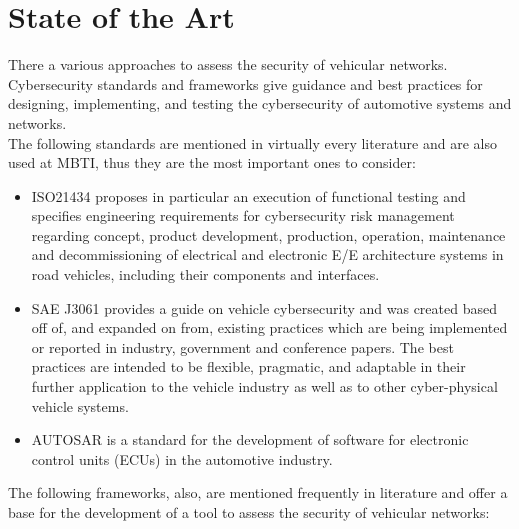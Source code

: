 \chapter{State of the Art}
\label{chp:stateoftheart}

There a various approaches to assess the security of vehicular networks.
Cybersecurity standards and frameworks give guidance and best practices for designing, implementing, 
and testing the cybersecurity of automotive systems and networks.\\

The following standards are mentioned in virtually every literature and are also used at MBTI,
thus they are the most important ones to consider:

\begin{itemize}
\item ISO21434 proposes in particular an execution of functional testing and specifies engineering requirements for cybersecurity risk management regarding concept, product development, production, operation, maintenance and decommissioning of electrical and electronic E/E architecture systems in road vehicles, including their components and interfaces\cite{iso21434}.\\

\item SAE J3061 provides a guide on vehicle cybersecurity and was created based off of, and expanded on from, existing practices which are being implemented or reported in industry, government and conference papers. The best practices are intended to be flexible, pragmatic, and adaptable in their further application to the vehicle industry as well as to other cyber-physical vehicle systems\cite{sae_j3061}.\\

\item AUTOSAR is a standard for the development of software for electronic control units (ECUs) in the automotive industry\cite{autosar}.\\
\end{itemize}

The following frameworks, also, are mentioned frequently in literature and offer a base 
for the development of a tool to assess the security of vehicular networks:

